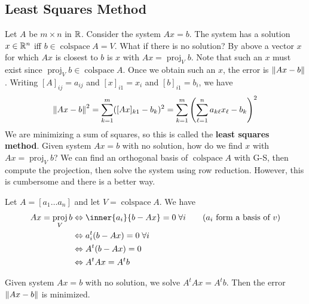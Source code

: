 \documentclass{article}
\DeclareMathOperator{\colspace}{colspace}
\DeclareMathOperator{\proj}{proj}
\begin{document}
\subsection{Least Squares Method}
\begin{remark}
  Let $A$ be $m \times n$ in $\mathbb{R}$. Consider the system $Ax = b$. The system has a solution $x \in \mathbb{R}^n$ iff $b \in \colspace A = V$. What if there is no solution? By above a vector $x$ for which $Ax$ is closest to $b$ is $x$ with $Ax = \proj_Vb$. Note that such an $x$ must exist since $\proj_Vb \in \colspace A$. Once we obtain such an $x$, the error is $\norm{Ax - b}$. Writing $[A]_{ij} = a_{ij}$ and $[x]_{i1} = x_i$ and $[b]_{i1} = b_i$, we have \[
    \norm{Ax - b}^2 = \sum_{k=1}^m ([Ax]_{k1} - b_k)^2  = \sum_{k=1}^m \left(\sum_{\ell = 1}^n a_{k\ell}x_\ell - b_k\right)^2
  \]
  We are minimizing a sum of squares, so this is called the \textbf{least squares method}. Given system $Ax = b$ with no solution, how do we find $x$ with $Ax = \proj_Vb$? We can find an orthogonal basis of $\colspace A$ with G-S, then compute the projection, then solve the system using row reduction. However, this is cumbersome and there is a better way.

  Let $A = [a_1 \dots a_n]$ and let $V = \colspace A$. We have
  \begin{align*}
    Ax = \proj_Vb & \iff \inner{a_i}{b-Ax} = 0 \; \forall i \tag{$a_i$ form a basis of $v$} \\
                  & \iff a_i^t(b-Ax) = 0 \; \forall i                                       \\
                  & \iff A^t(b-Ax) = 0                                                      \\
                  & \iff A^tAx = A^tb                                                       \\
  \end{align*}
\end{remark}
\begin{theorem}
  Given system $Ax = b$ with no solution, we solve $A^tAx = A^tb$. Then the error $\norm{Ax - b}$ is minimized.
\end{theorem}
\end{document}
